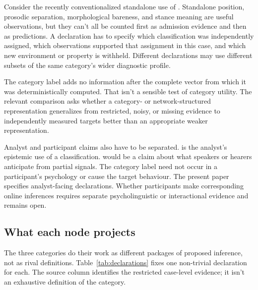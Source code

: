 \documentclass[12pt]{article}
\begin{document}
Consider the recently conventionalized standalone use of .
Standalone position, prosodic separation, morphological bareness, and stance
meaning are useful observations, but they can't all be counted first as
admission evidence and then as predictions. A declaration has to specify which
classification was independently assigned, which observations supported that
assignment in this case, and which new environment or property is withheld.
Different declarations may use different subsets of the same
category's wider diagnostic profile.

The category label adds no information after the complete vector from which it
was deterministically computed. That isn't a sensible test of category
utility. The relevant comparison asks whether a category- or network-structured
representation generalizes from restricted, noisy, or missing evidence to
independently measured targets better than an appropriate weaker
representation.

Analyst and participant claims also have to be separated.
 is the analyst's epistemic use of a
classification.  would be a claim about what
speakers or hearers anticipate from partial signals. The category label need
not occur in a participant's psychology or cause the target behaviour. The
present paper specifies analyst-facing declarations. Whether participants
make corresponding online inferences requires separate psycholinguistic or
interactional evidence and remains open.

\subsection{What each node projects}\label{sec:proj-fieldrelative}

The three categories do their work as different packages of proposed
inference, not as rival definitions. Table~\ref{tab:declarations} fixes one
non-trivial declaration for each. The source column identifies the restricted
case-level evidence; it isn't an exhaustive definition of the category.
\end{document}
